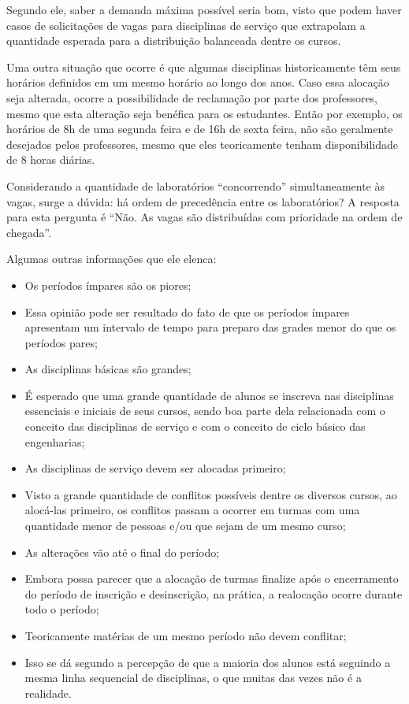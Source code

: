 Segundo ele, saber a demanda máxima possível seria bom, visto que podem haver casos de solicitações de vagas para disciplinas de serviço que extrapolam a quantidade esperada para a distribuição balanceada dentre os cursos.

Uma outra situação que ocorre é que algumas disciplinas historicamente têm seus horários definidos em um mesmo horário ao longo dos anos. Caso essa alocação seja alterada, ocorre a possibilidade de reclamação por parte dos professores, mesmo que esta alteração seja benéfica para os estudantes. Então por exemplo, os horários de 8h de uma segunda feira e de 16h de sexta feira, não são geralmente desejados pelos professores, mesmo que eles teoricamente tenham disponibilidade de 8 horas diárias.

Considerando a quantidade de laboratórios ``concorrendo'' simultaneamente às vagas, surge a dúvida: há ordem de precedência entre os laboratórios? A resposta para esta pergunta é ``Não. As vagas são distribuídas com prioridade na ordem de chegada''.

Algumas outras informações que ele elenca:

\begin{itemize}
  \item Os períodos ímpares são os piores;
  \item Essa opinião pode ser resultado do fato de que os períodos ímpares apresentam um intervalo de tempo para preparo das grades menor do que os períodos pares;
  \item As disciplinas básicas são grandes;
  \item É esperado que uma grande quantidade de alunos se inscreva nas disciplinas essenciais e iniciais de seus cursos, sendo boa parte dela relacionada com o conceito das disciplinas de serviço e com o conceito de ciclo básico das engenharias;
  \item As disciplinas de serviço devem ser alocadas primeiro;
  \item Visto a grande quantidade de conflitos possíveis dentre os diversos cursos, ao alocá-las primeiro, os conflitos passam a ocorrer em turmas com uma quantidade menor de pessoas e/ou que sejam de um mesmo curso;
  \item As alterações vão até o final do período;
  \item Embora possa parecer que a alocação de turmas finalize após o encerramento do período de inscrição e desinscrição, na prática, a realocação ocorre durante todo o período;
  \item Teoricamente matérias de um mesmo período não devem conflitar;
  \item Isso se dá segundo a percepção de que a maioria dos alunos está seguindo a mesma linha sequencial de disciplinas, o que muitas das vezes não é a realidade.
\end{itemize}

